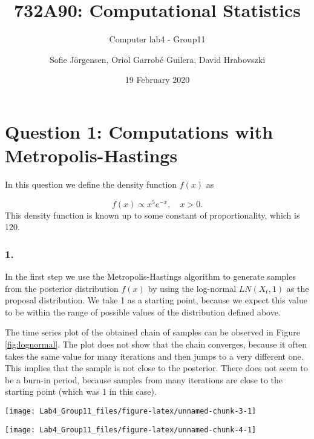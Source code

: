 \documentclass[]{article}
\title{732A90: Computational Statistics}
\subtitle{Computer lab4 - Group11}
\author{Sofie Jörgensen, Oriol Garrobé Guilera, David Hrabovszki}
\date{19 February 2020}
\let\origfigure\figure
\let\endorigfigure\endfigure
\renewenvironment{figure}[1][2] {
    \expandafter\origfigure\expandafter[H]
} {
    \endorigfigure
}
\begin{document}
\maketitle

\hypertarget{question-1-computations-with-metropolis-hastings}{%
\section{Question 1: Computations with
Metropolis-Hastings}\label{question-1-computations-with-metropolis-hastings}}

In this question we define the density function \(f(x)\) as

\[f(x)\propto x^5e^{-x}, \quad x>0.\] This density function is known up
to some constant of proportionality, which is 120.

\hypertarget{section}{%
\subsubsection{1.}\label{section}}

In the first step we use the Metropolis-Hastings algorithm to generate
samples from the posterior distribution \(f(x)\) by using the log-normal
\(LN(X_t,1)\) as the proposal distribution. We take 1 as a starting
point, because we expect this value to be within the range of possible
values of the distribution defined above.

The time series plot of the obtained chain of samples can be observed in
Figure \ref{fig:lognormal}. The plot does not show that the chain
converges, because it often takes the same value for many iterations and
then jumps to a very different one. This implies that the sample is not
close to the posterior. There does not seem to be a burn-in period,
because samples from many iterations are close to the starting point
(which was 1 in this case).

\begin{figure}[h]

{\centering \texttt{[image: Lab4\_Group11\_files/figure-latex/unnamed-chunk-3-1]} 

}

\caption{\label{fig:lognormal} Metropolis-Hastings sampler with log-normal proposal}\label{fig:unnamed-chunk-3}
\end{figure}

\begin{figure}[h]

{\centering \texttt{[image: Lab4\_Group11\_files/figure-latex/unnamed-chunk-4-1]} 

}

\caption{\label{fig:lognormal_hist} Histogram of generated samples with log-normal proposal (MH sampler)}\label{fig:unnamed-chunk-4}
\end{figure}
\end{document}
